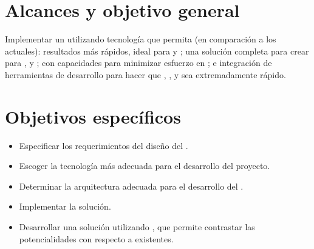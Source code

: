 	\section{Alcances y objetivo general}\label{cap:intro:alcances}

		Implementar un \frameworkPC \ecommerceCOM utilizando tecnología \freePC \openSourcePC que permita (en comparación a los \frameworksPC actuales):  resultados más rápidos, ideal para \prototypesCPT y \mvpSiglasCOM; una solución completa para crear \featuresCPT para \serversAS \cite{online_ecommerce_solution_requires}, \browsersINT y \devicesINT \mobilesINT; \builtINPL con capacidades \realTimeINT para minimizar esfuerzo en \developmentPC; e integración de herramientas de desarrollo para hacer que \setupCPT, \developmentPC, y \deploymentCPT sea extremadamente rápido. 


	\section{Objetivos específicos}\label{cap:intro:objetivos}

		\begin{itemize}
			\item Especificar los requerimientos del diseño del \frameworkPC.
			\item Escoger la tecnología más adecuada para el desarrollo del proyecto.
			\item Determinar la arquitectura adecuada para el desarrollo del \frameworkPC.
			\item Implementar la solución.
			\item Desarrollar una solución utilizando \frameworkname, que permite contrastar las potencialidades con respecto a \frameworksPC existentes.
		\end{itemize}


